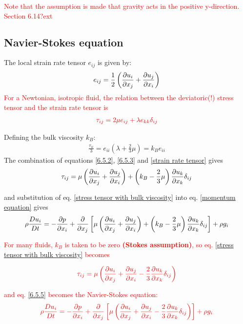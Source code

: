 \documentclass[document.tex]{subfiles}
\begin{document}
\textcolor{red}{Note that the assumption is made that gravity acts in the positive y-direction. 
Section 6.14?ext}

\subsection{Navier-Stokes equation}
The local strain rate tensor $e_{ij}$ is given by: 
\begin{align} \label{strain rate tensor}
    e_{ij} = \frac{1}{2}\left(\pdv{u_i}{x_j}+\pdv{u_j}{x_i}\right)
\end{align}
\textcolor{red}{For a Newtonian, isotropic fluid, the relation between the deviatoric(!) 
stress tensor and the strain rate tensor is}
\begin{align} \label{6.5.2}
    \color{red}
    \tau_{ij} = 2\mu e_{ij} + \lambda e_{kk} \delta_{ij}
\end{align}

Defining the bulk viscosity $k_B$: 
\begin{align} \label{6.5.3}
    \frac{\tau_{ii}}{3} = e_{ii}\left(\lambda +\frac{2}{3}\mu\right) = k_Be_{ii}
\end{align}
The combination of equations \ref{6.5.2}, \ref{6.5.3} and \ref{strain rate tensor} gives
\begin{align} \label{stress tensor with bulk viscosity}
    \tau_{ij} = \mu \left(\pdv{u_i}{x_j}+\pdv{u_j}{x_i}\right) + \left(k_B - \frac{2}{3} \mu \right)\pdv{u_k}{x_k}\delta_{ij}
\end{align}

and substitution of eq. \ref{stress tensor with bulk viscosity} into eq. \ref{momentum equation} gives
\begin{align} \label{6.5.5}
    \rho \frac{D u_i}{D t} = - \pdv{p}{x_i} + \pdv{x_j}\left[\mu \left(\pdv{u_i}{x_j}+\pdv{u_j}{x_i}\right) + 
    \left(k_B - \frac{2}{3} \mu \right)\pdv{u_k}{x_k}\delta_{ij}\right] + \rho g_i
\end{align}

\textcolor{red}{For many fluids, $k_B$ is taken to be zero \textbf{(Stokes assumption)}, 
so eq. \ref{stress tensor with bulk viscosity} becomes} 

\begin{align} \label{6.5.6}
    \color{red}
     \tau_{ij} = \mu \left(\pdv{u_i}{x_j}+\pdv{u_j}{x_i} - \frac{2}{3}\pdv{u_k}{x_k}\delta_{ij}\right)
\end{align}

\textcolor{red}{and eq. \ref{6.5.5} becomes the Navier-Stokes equation:}
\begin{align} \label{6.5.7}
    \color{red}
    \rho \frac{D u_i}{D t} = - \pdv{p}{x_i} + \pdv{x_j}\left[\mu \left(\pdv{u_i}{x_j}
    +\pdv{u_j}{x_i}-\frac{2}{3}\pdv{u_k}{x_k}\delta_{ij}\right)\right]
    + \rho g_i
\end{align}
\end{document}
